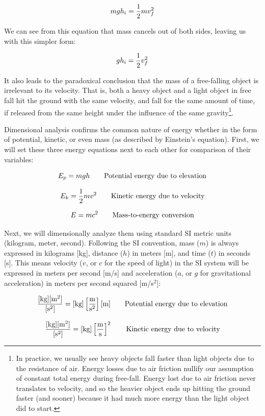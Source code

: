 $$mgh_i = {1 \over 2} mv^2_f$$

We can see from this equation that mass cancels out of both sides, leaving us with this simpler form:

$$gh_i = {1 \over 2} v^2_f$$

It also leads to the paradoxical conclusion that the mass of a free-falling object is irrelevant to its velocity.  That is, both a heavy object and a light object in free fall hit the ground with the same velocity, and fall for the same amount of time, if released from the same height under the influence of the same gravity\footnote{In practice, we usually see heavy objects fall faster than light objects due to the resistance of air.  Energy losses due to air friction nullify our assumption of constant total energy during free-fall.  Energy lost due to air friction never translates to velocity, and so the heavier object ends up hitting the ground faster (and sooner) because it had much more energy than the light object did to start.}.

\vskip 10pt

\filbreak

Dimensional analysis confirms the common nature of energy whether in the form of potential, kinetic, or even mass (as described by Einstein's equation).  First, we will set these three energy equations next to each other for comparison of their variables:  

$$E_p = mgh \hbox{\hskip 20pt Potential energy due to elevation}$$

$$E_k = {1 \over 2} mv^2 \hbox{\hskip 20pt Kinetic energy due to velocity}$$

$$E = mc^2 \hbox{\hskip 20pt Mass-to-energy conversion}$$

Next, we will dimensionally analyze them using standard SI metric units (kilogram, meter, second).  Following the SI convention, mass ($m$) is always expressed in kilograms [kg], distance ($h$) in meters [m], and time ($t$) in seconds [s].  This means velocity ($v$, or $c$ for the speed of light) in the SI system will be expressed in meters per second [m/s] and acceleration ($a$, or $g$ for gravitational acceleration) in meters per second squared [m/s$^{2}$]:

$${[\hbox{kg}][\hbox{m}^2] \over [\hbox{s}^2]} = [\hbox{kg}] \left[\hbox{m} \over \hbox{s}^2\right] [\hbox{m}] \hbox{\hskip 20pt Potential energy due to elevation}$$

$${[\hbox{kg}][\hbox{m}^2] \over [\hbox{s}^2]} = [\hbox{kg}] \left[\hbox{m} \over \hbox{s}\right]^2 \hbox{\hskip 20pt Kinetic energy due to velocity}$$

